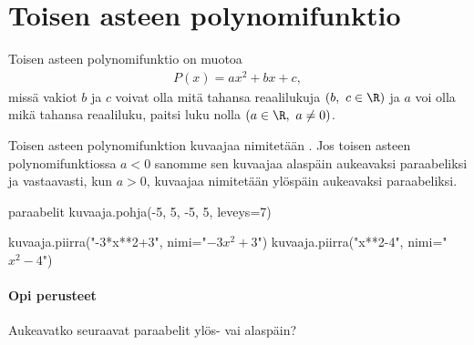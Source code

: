 \section{Toisen asteen polynomifunktio}


Toisen asteen polynomifunktio on muotoa
\begin{align*}
P(x)=ax^2+bx+c,
\end{align*}
missä vakiot $b$ ja $c$ voivat olla mitä tahansa reaalilukuja $(b, \ c \in \R)$ ja $a$ voi olla mikä tahansa reaaliluku, paitsi luku nolla $(a \in \R, \ a \neq 0)$.

Toisen asteen polynomifunktion kuvaajaa nimitetään . Jos toisen asteen polynomifunktiossa $a < 0$ sanomme sen kuvaajaa
alaspäin aukeavaksi paraabeliksi ja vastaavasti, kun $a > 0$, kuvaajaa nimitetään ylöspäin aukeavaksi paraabeliksi.

\begin{luoKuva}{paraabelit}
	kuvaaja.pohja(-5, 5, -5, 5, leveys=7)
	
	kuvaaja.piirra("-3*x**2+3", nimi="$-3x^2+3$")
	kuvaaja.piirra("x**2-4", nimi="$x^2-4$")
\end{luoKuva}

\begin{center}
\end{center}

\begin{tehtavasivu}

\paragraph*{Opi perusteet}

\begin{tehtava}
  Aukeavatko seuraavat paraabelit ylös- vai alaspäin?
  \begin{alakohdat}
  \end{alakohdat}

  \begin{vastaus}
    \begin{alakohdat}
    \end{alakohdat}
  \end{vastaus}
\end{tehtava}

\end{tehtavasivu}